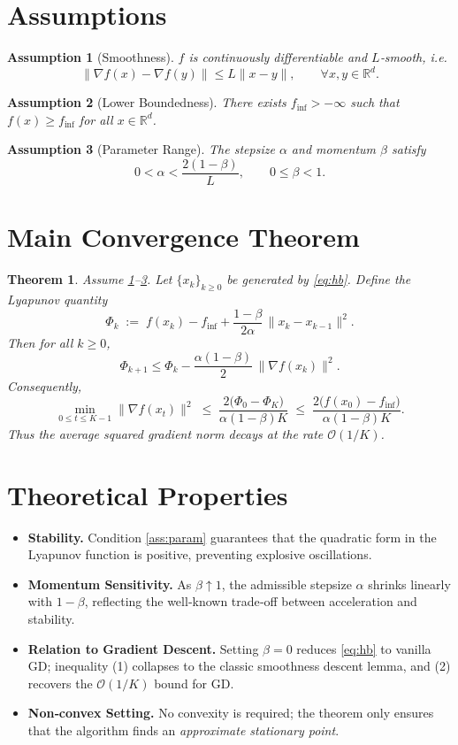 \documentclass{article}
\newtheorem{theorem}{Theorem}
\newtheorem{assumption}{Assumption}
\newcommand{\R}{\mathbb{R}}
\begin{document}
\newpage
\section*{Assumptions}
\begin{assumption}[Smoothness]\label{ass:smooth}
$f$ is continuously differentiable and $L$‑smooth, i.e.
\[
\|\nabla f(x)-\nabla f(y)\| \le L\|x-y\|,\qquad \forall x,y\in\R^{d}.
\]
\end{assumption}
\begin{assumption}[Lower Boundedness]\label{ass:lb}
There exists $f_{\inf}>-\infty$ such that $f(x)\ge f_{\inf}$ for all $x\in\R^{d}$.
\end{assumption}
\begin{assumption}[Parameter Range]\label{ass:param}
The stepsize $\alpha$ and momentum $\beta$ satisfy
\[
0<\alpha<\frac{2(1-\beta)}{L},\qquad 0\le\beta<1.
\]
\end{assumption}

\section*{Main Convergence Theorem}
\begin{theorem}\label{thm:hb}
Assume \ref{ass:smooth}–\ref{ass:param}. Let $\{x_{k}\}_{k\ge0}$ be generated by \eqref{eq:hb}. Define the Lyapunov quantity
\[
\Phi_{k}\;:=\; f(x_{k})-f_{\inf}+\frac{1-\beta}{2\alpha}\,\|x_{k}-x_{k-1}\|^{2}.
\]
Then for all $k\ge 0$,
\[
\Phi_{k+1}\le \Phi_{k}-\frac{\alpha(1-\beta)}{2}\,\|\nabla f(x_{k})\|^{2}.
\tag{1}
\]
Consequently,
\[
\min_{0\le t\le K-1}\|\nabla f(x_{t})\|^{2}\;\le\;
\frac{2\bigl(\Phi_{0}-\Phi_{K}\bigr)}{\alpha(1-\beta)K}
\;\le\;
\frac{2\bigl(f(x_{0})-f_{\inf}\bigr)}{\alpha(1-\beta)K}.
\tag{2}
\]
Thus the average squared gradient norm decays at the rate $\mathcal{O}(1/K)$.
\end{theorem}

\section*{Theoretical Properties}
\begin{itemize}[leftmargin=*]
\item \textbf{Stability.} Condition \eqref{ass:param} guarantees that the quadratic form in the Lyapunov function is positive, preventing explosive oscillations.
\item \textbf{Momentum Sensitivity.} As $\beta\!\uparrow\!1$, the admissible stepsize $\alpha$ shrinks linearly with $1-\beta$, reflecting the well‑known trade‑off between acceleration and stability.
\item \textbf{Relation to Gradient Descent.} Setting $\beta=0$ reduces \eqref{eq:hb} to vanilla GD; inequality (1) collapses to the classic smoothness descent lemma, and (2) recovers the $\mathcal{O}(1/K)$ bound for GD.
\item \textbf{Non‑convex Setting.} No convexity is required; the theorem only ensures that the algorithm finds an \emph{approximate stationary point}.
\end{itemize}
\end{document}
